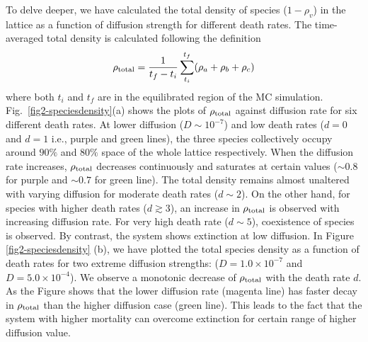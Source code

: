 \documentclass[aps, pre, twocolumn, amsmath, superscriptaddress,showkeys,showpacs]{revtex4-1}
\def\be{\begin{equation}}
\def\ee{\end{equation}}
\begin{document}
\par To delve deeper, we have calculated the {total density of species ($1 - \rho_v$)} in the lattice as a function of diffusion strength for different death rates. {The time-averaged total density is calculated following the definition
\be \rho_{\rm total} = \dfrac{1}{t_f - t_i}\sum\limits_{t_i}^{t_f} (\rho_a + \rho_b + \rho_c)\ee
where both $t_i$ and $t_f$ are in the equilibrated region of the MC simulation. Fig.\ \ref{fig2-speciesdensity}(a) shows the plots of $\rho_{\rm total}$ against diffusion rate for six different death rates.} At lower diffusion ($D\sim 10^{-7}$) and low death rates ($d=0$ and $d=1$ i.e., purple and green lines), the three species collectively occupy around $90\%$ and $80\%$ space of the whole lattice respectively. When the diffusion rate increases, $\rho_{\rm total}$ decreases continuously and saturates at certain values ($\sim 0.8$ for purple and $\sim 0.7$ for green line). The total density remains almost unaltered with varying diffusion for moderate death rates ($d\sim 2$). On the other hand, for species with higher death rates ($d\gtrsim 3$), an increase in $\rho_{\rm total}$ is observed with increasing diffusion rate. For very high death rate ($d\sim 5$), { coexistence of species is observed. By contrast,  the system shows extinction at  low diffusion.}
In Figure  \ref{fig2-speciesdensity} (b), we have plotted the total species density as a function of  death rates for two extreme diffusion strengths: ($D=1.0\times10^{-7}$ and $D=5.0\times10^{-4}$). We observe a monotonic decrease of $\rho_{\rm total}$ with the death rate $d$. As the Figure shows that  the lower diffusion rate (magenta line) has faster decay in  $\rho_{\rm total}$ than the higher diffusion case (green line). 
{ This leads to the fact that the system with higher mortality can overcome extinction  for certain range of higher diffusion value.}
\end{document}
